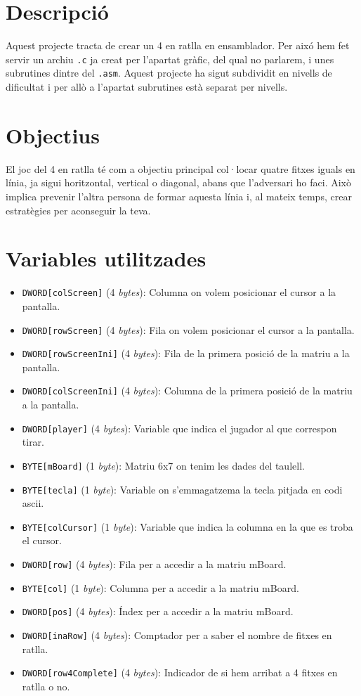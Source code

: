 \documentclass[a4paper,12pt]{article}
\begin{document}

\tableofcontents
\section{Descripció}
Aquest projecte tracta de crear un 4 en ratlla en ensamblador. Per aixó hem fet servir un archiu \verb|.c| ja creat per l'apartat gràfic, del qual no parlarem, i unes subrutines dintre del \verb|.asm|. Aquest projecte ha sigut subdividit en nivells de dificultat i per allò a l'apartat subrutines està separat per nivells.
\section{Objectius}
El joc del 4 en ratlla té com a objectiu principal col·locar quatre fitxes iguals en línia, ja sigui horitzontal, vertical o diagonal, abans que l'adversari ho faci. Això implica prevenir l'altra persona de formar aquesta línia i, al mateix temps, crear estratègies per aconseguir la teva.
\section{Variables utilitzades}
\begin{itemize}
    \item \lstinline|DWORD[colScreen]| (4 \textit{bytes}): Columna on volem posicionar el cursor a la pantalla.
    \item \lstinline|DWORD[rowScreen]| (4 \textit{bytes}): Fila on volem posicionar el cursor a la pantalla.
    \item \lstinline|DWORD[rowScreenIni]| (4 \textit{bytes}): Fila de la primera posició de la matriu a la pantalla.
    \item \lstinline|DWORD[colScreenIni]| (4 \textit{bytes}): Columna de la primera posició de la matriu a la pantalla.
    \item \lstinline|DWORD[player]| (4 \textit{bytes}): Variable que indica el jugador al que correspon tirar.
    \item \lstinline|BYTE[mBoard]| (1 \textit{byte}): Matriu 6x7 on tenim les dades del taulell.
    \item \lstinline|BYTE[tecla]| (1 \textit{byte}): Variable on s’emmagatzema la tecla pitjada en codi ascii.
    \item \lstinline|BYTE[colCursor]| (1 \textit{byte}): Variable que indica la columna en la que es troba el cursor.
    \item \lstinline|DWORD[row]| (4 \textit{bytes}): Fila per a accedir a la matriu mBoard.
    \item \lstinline|BYTE[col]| (1 \textit{byte}): Columna per a accedir a la matriu mBoard.
    \item \lstinline|DWORD[pos]| (4 \textit{bytes}): Índex per a accedir a la matriu mBoard.
    \item \lstinline|DWORD[inaRow]| (4 \textit{bytes}): Comptador per a saber el nombre de fitxes en ratlla.
    \item \lstinline|DWORD[row4Complete]| (4 \textit{bytes}): Indicador de si hem arribat a 4 fitxes en ratlla o no.
\end{itemize}
\end{document}
